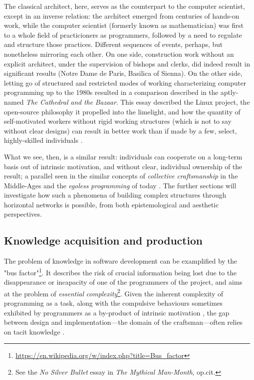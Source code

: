 The classical architect, here, serves as the counterpart to the computer scientist, except in an inverse relation: the architect emerged from centuries of hands-on work, while the computer scientist (formerly known as mathematician) was first to a whole field of practicioners as programmers, followed by a need to regulate and structure those practices. Different sequences of events, perhaps, but nonetheless mirroring each other. On one side, construction work without an explicit architect, under the supervision of bishops and clerks, did indeed result in significant results (Notre Dame de Paris, Basilica of Sienna). On the other side, letting go of structured and restricted modes of working characterizing computer programming up to the 1980s resulted in a comparison described in the aptly-named \textit{The Cathedral and the Bazaar}. This essay described the Linux project, the open-source philosophy it propelled into the limelight, and how the quantity of self-motivated workers without rigid working structures (which is not to say without clear designs) can result in better work than if made by a few, select, highly-skilled individuals \citep{raymond_cathedral_2001,henningsen_joys_2020}.

What we see, then, is a similar result: individuals can cooperate on a long-term basis out of intrinsic motivation, and without clear, individual ownership of the result; a parallel seen in the similar concepts of \textit{collective craftsmanship} in the Middle-Ages and the \emph{egoless programming} of today \citep{brooks_mythical_1975}. The further sections will investigate how such a phenomena of building complex structures through horizontal networks is possible, from both epistemological and aesthetic perspectives.

\subsection{Knowledge acquisition and production}
\label{subsec:craft-knowledge}

The problem of knowledge in software development can be examplified by the "bus factor"\footnote{\url{https://en.wikipedia.org/w/index.php?title=Bus_factor}}. It describes the risk of crucial information being lost due to the disappearance or incapacity of one of the programmers of the project, and aims at the problem of \emph{essential complexity}\footnote{See the \textit{No Silver Bullet} essay in \emph{The Mythical Man-Month}, op.cit.}. Given the inherent complexity of programming as a task, along with the compulsive behaviours sometimes exhibited by programmers as a by-product of intrinsic motivation \citep{weizenbaum_computer_1976}, the gap between design and implementation---the domain of the craftsman---often relies on tacit knowledge \citep{collins_tacit_2010}.

